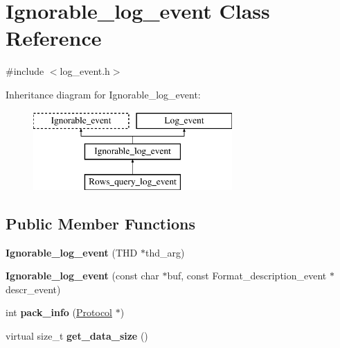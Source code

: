 \hypertarget{classIgnorable__log__event}{}\section{Ignorable\+\_\+log\+\_\+event Class Reference}
\label{classIgnorable__log__event}


{\ttfamily \#include $<$log\+\_\+event.\+h$>$}

Inheritance diagram for Ignorable\+\_\+log\+\_\+event\+:\begin{figure}[H]
\begin{center}
\leavevmode
\includegraphics[height=3.000000cm]{classIgnorable__log__event}
\end{center}
\end{figure}
\subsection*{Public Member Functions}
\begin{DoxyCompactItemize}
\item 
\mbox{\label{classIgnorable__log__event_a08e90b85b4778c8255376a8ff6e58af0}} 
{\bfseries Ignorable\+\_\+log\+\_\+event} (T\+HD $\ast$thd\+\_\+arg)
\item 
\mbox{\label{classIgnorable__log__event_a3375b42e8b37e33021498e06590062dd}} 
{\bfseries Ignorable\+\_\+log\+\_\+event} (const char $\ast$buf, const Format\+\_\+description\+\_\+event $\ast$descr\+\_\+event)
\item 
\mbox{\label{classIgnorable__log__event_af30ab04c14a2a786e2bf2832acca7f1d}} 
int {\bfseries pack\+\_\+info} (\mbox{\hyperlink{classProtocol}{Protocol}} $\ast$)
\item 
\mbox{\label{classIgnorable__log__event_ac7b279d957de2aa4707b35c93b765a63}} 
virtual size\+\_\+t {\bfseries get\+\_\+data\+\_\+size} ()
\end{DoxyCompactItemize}
